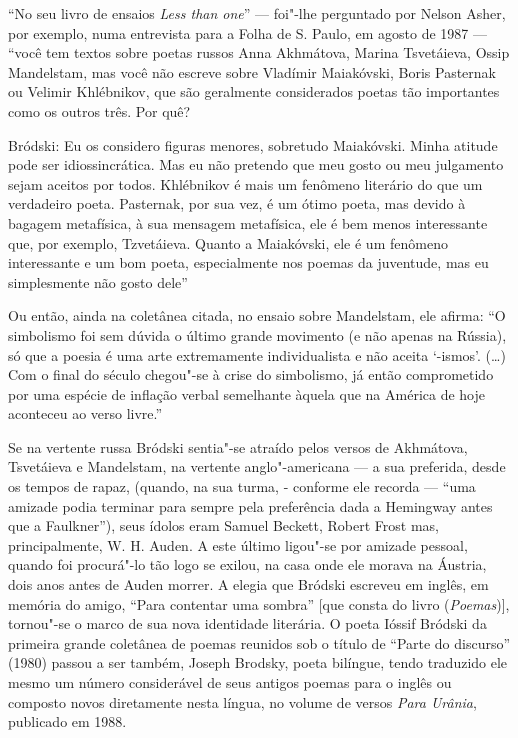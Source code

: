 ``No seu livro de ensaios \emph{Less than one}'' --- foi"-lhe perguntado
por Nelson Asher, por exemplo, numa entrevista para a Folha de S. Paulo,
em agosto de 1987 --- ``você tem textos sobre poetas russos Anna
Akhmátova, Marina Tsvetáieva, Ossip Mandelstam, mas você não escreve
sobre Vladímir Maiakóvski, Boris Pasternak ou Velimir Khlébnikov, que
são geralmente considerados poetas tão importantes como os outros três.
Por quê?

Bródski: Eu os considero figuras menores, sobretudo Maiakóvski. Minha
atitude pode ser idiossincrática. Mas eu não pretendo que meu gosto ou
meu julgamento sejam aceitos por todos. Khlébnikov é mais um fenômeno
literário do que um verdadeiro poeta. Pasternak, por sua vez, é um ótimo
poeta, mas devido à bagagem metafísica, à sua mensagem metafísica, ele é
bem menos interessante que, por exemplo, Tzvetáieva. Quanto a
Maiakóvski, ele é um fenômeno interessante e um bom poeta, especialmente
nos poemas da juventude, mas eu simplesmente não gosto dele''

Ou então, ainda na coletânea citada, no ensaio sobre Mandelstam, ele
afirma: ``O simbolismo foi sem dúvida o último grande movimento (e não
apenas na Rússia), só que a poesia é uma arte extremamente
individualista e não aceita `-ismos'. (\ldots{}) Com o final do século
chegou"-se à crise do simbolismo, já então comprometido por uma espécie
de inflação verbal semelhante àquela que na América de hoje aconteceu ao
verso livre.''

Se na vertente russa Bródski sentia"-se atraído pelos versos de
Akhmátova, Tsvetáieva e Mandelstam, na vertente anglo"-americana --- a sua
preferida, desde os tempos de rapaz, (quando, na sua turma, - conforme
ele recorda --- ``uma amizade podia terminar para sempre pela preferência
dada a Hemingway antes que a Faulkner''), seus ídolos eram Samuel
Beckett, Robert Frost mas, principalmente, W. H. Auden. A este último
ligou"-se por amizade pessoal, quando foi procurá"-lo tão logo se exilou,
na casa onde ele morava na Áustria, dois anos antes de Auden morrer. A
elegia que Bródski escreveu em inglês, em memória do amigo, ``Para
contentar uma sombra'' [que consta do livro \emph{ }
(\emph{Poemas})], tornou"-se o marco de sua nova identidade
literária. O poeta Ióssif Bródski da primeira grande coletânea de poemas
reunidos sob o título de ``Parte do discurso'' (1980) passou a ser
também, Joseph Brodsky, poeta bilíngue, tendo traduzido ele mesmo um
número considerável de seus antigos poemas para o inglês ou composto
novos diretamente nesta língua, no volume de versos \emph{Para Urânia},
publicado em 1988.

